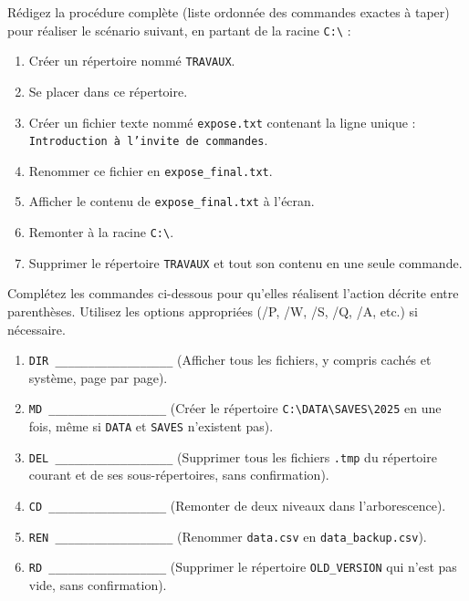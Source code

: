 \documentclass[11pt]{article}
\begin{document}
\begin{exercice}
Rédigez la procédure complète (liste ordonnée des commandes exactes à taper) pour réaliser le scénario suivant, en partant de la racine \texttt{C:\textbackslash} :
\begin{enumerate}
    \item Créer un répertoire nommé \texttt{TRAVAUX}.
    \item Se placer dans ce répertoire.
    \item Créer un fichier texte nommé \texttt{expose.txt} contenant la ligne unique : \texttt{Introduction à l'invite de commandes}.
    \item Renommer ce fichier en \texttt{expose\_final.txt}.
    \item Afficher le contenu de \texttt{expose\_final.txt} à l'écran.
    \item Remonter à la racine \texttt{C:\textbackslash}.
    \item Supprimer le répertoire \texttt{TRAVAUX} et tout son contenu en une seule commande.
\end{enumerate}
\end{exercice}

\begin{exercice}
Complétez les commandes ci-dessous pour qu'elles réalisent l'action décrite entre parenthèses. Utilisez les options appropriées (/P, /W, /S, /Q, /A, etc.) si nécessaire.
\begin{enumerate}
    \item \texttt{DIR \_\_\_\_\_\_\_\_\_\_\_\_\_\_\_\_\_\_} (Afficher tous les fichiers, y compris cachés et système, page par page).
    \item \texttt{MD \_\_\_\_\_\_\_\_\_\_\_\_\_\_\_\_\_\_} (Créer le répertoire \texttt{C:\textbackslash DATA\textbackslash SAVES\textbackslash 2025} en une fois, même si \texttt{DATA} et \texttt{SAVES} n'existent pas).
    \item \texttt{DEL \_\_\_\_\_\_\_\_\_\_\_\_\_\_\_\_\_\_} (Supprimer tous les fichiers \texttt{.tmp} du répertoire courant et de ses sous-répertoires, sans confirmation).
    \item \texttt{CD \_\_\_\_\_\_\_\_\_\_\_\_\_\_\_\_\_\_} (Remonter de deux niveaux dans l'arborescence).
    \item \texttt{REN \_\_\_\_\_\_\_\_\_\_\_\_\_\_\_\_\_\_} (Renommer \texttt{data.csv} en \texttt{data\_backup.csv}).
    \item \texttt{RD \_\_\_\_\_\_\_\_\_\_\_\_\_\_\_\_\_\_} (Supprimer le répertoire \texttt{OLD\_VERSION} qui n'est pas vide, sans confirmation).
\end{enumerate}
\end{exercice}
\end{document}
